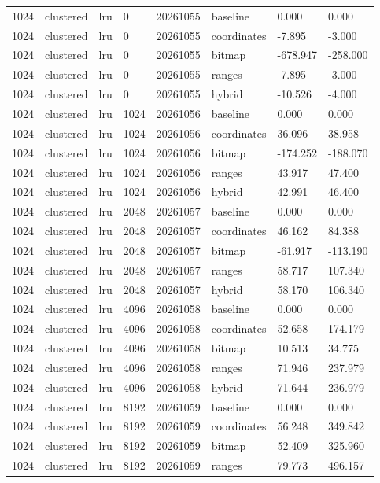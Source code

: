 \begin{tabular}{llllllll}
1024 & clustered & lru & 0 & 20261055 & baseline & 0.000 & 0.000 \\
1024 & clustered & lru & 0 & 20261055 & coordinates & -7.895 & -3.000 \\
1024 & clustered & lru & 0 & 20261055 & bitmap & -678.947 & -258.000 \\
1024 & clustered & lru & 0 & 20261055 & ranges & -7.895 & -3.000 \\
1024 & clustered & lru & 0 & 20261055 & hybrid & -10.526 & -4.000 \\
1024 & clustered & lru & 1024 & 20261056 & baseline & 0.000 & 0.000 \\
1024 & clustered & lru & 1024 & 20261056 & coordinates & 36.096 & 38.958 \\
1024 & clustered & lru & 1024 & 20261056 & bitmap & -174.252 & -188.070 \\
1024 & clustered & lru & 1024 & 20261056 & ranges & 43.917 & 47.400 \\
1024 & clustered & lru & 1024 & 20261056 & hybrid & 42.991 & 46.400 \\
1024 & clustered & lru & 2048 & 20261057 & baseline & 0.000 & 0.000 \\
1024 & clustered & lru & 2048 & 20261057 & coordinates & 46.162 & 84.388 \\
1024 & clustered & lru & 2048 & 20261057 & bitmap & -61.917 & -113.190 \\
1024 & clustered & lru & 2048 & 20261057 & ranges & 58.717 & 107.340 \\
1024 & clustered & lru & 2048 & 20261057 & hybrid & 58.170 & 106.340 \\
1024 & clustered & lru & 4096 & 20261058 & baseline & 0.000 & 0.000 \\
1024 & clustered & lru & 4096 & 20261058 & coordinates & 52.658 & 174.179 \\
1024 & clustered & lru & 4096 & 20261058 & bitmap & 10.513 & 34.775 \\
1024 & clustered & lru & 4096 & 20261058 & ranges & 71.946 & 237.979 \\
1024 & clustered & lru & 4096 & 20261058 & hybrid & 71.644 & 236.979 \\
1024 & clustered & lru & 8192 & 20261059 & baseline & 0.000 & 0.000 \\
1024 & clustered & lru & 8192 & 20261059 & coordinates & 56.248 & 349.842 \\
1024 & clustered & lru & 8192 & 20261059 & bitmap & 52.409 & 325.960 \\
1024 & clustered & lru & 8192 & 20261059 & ranges & 79.773 & 496.157 \\

\end{tabular}
